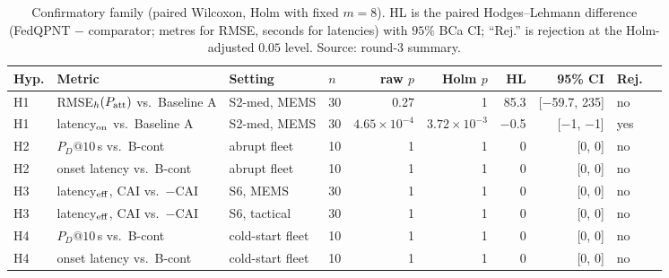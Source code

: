\documentclass[journal]{IEEEtran}
\begin{document}
\begin{table}[t]
\centering
\caption{Confirmatory family (paired Wilcoxon, Holm with fixed $m=8$). HL is the paired Hodges--Lehmann difference (FedQPNT $-$ comparator; metres for RMSE, seconds for latencies) with $95\%$ BCa CI; ``Rej.'' is rejection at the Holm-adjusted $0.05$ level. Source: round-3 summary.}
\label{tab:conf}
\scriptsize
\setlength{\tabcolsep}{3pt}
\begin{tabular}{llllrrrrlc}
\toprule
Hyp. & Metric & Setting & $n$ & raw $p$ & Holm $p$ & HL & 95\% CI & Rej. \\
\midrule
H1 & RMSE$_h(P_{\rm att})$ vs.\ Baseline A & S2-med, MEMS & 30 & 0.27 & 1 & 85.3 & [$-$59.7, 235] & no \\
H1 & latency$_{\rm on}$ vs.\ Baseline A & S2-med, MEMS & 30 & $4.65\times 10^{-4}$ & $3.72\times 10^{-3}$ & $-$0.5 & [$-$1, $-$1] & yes \\
H2 & $P_D@10$\,s vs.\ B-cont & abrupt fleet & 10 & 1 & 1 & 0 & [0, 0] & no \\
H2 & onset latency vs.\ B-cont & abrupt fleet & 10 & 1 & 1 & 0 & [0, 0] & no \\
H3 & latency$_{\rm eff}$, CAI vs.\ $-$CAI & S6, MEMS & 30 & 1 & 1 & 0 & [0, 0] & no \\
H3 & latency$_{\rm eff}$, CAI vs.\ $-$CAI & S6, tactical & 30 & 1 & 1 & 0 & [0, 0] & no \\
H4 & $P_D@10$\,s vs.\ B-cont & cold-start fleet & 10 & 1 & 1 & 0 & [0, 0] & no \\
H4 & onset latency vs.\ B-cont & cold-start fleet & 10 & 1 & 1 & 0 & [0, 0] & no \\
\bottomrule
\end{tabular}
\end{table}
\end{document}
